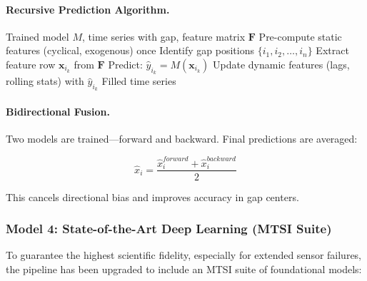 \documentclass[12pt,a4paper]{article}
\begin{document}
\paragraph{Recursive Prediction Algorithm.}

\begin{algorithm}[H]
\caption{XGBoost Recursive Gap Filling (Optimized $O(n)$)}
\begin{algorithmic}[1]
\Require Trained model $M$, time series with gap, feature matrix $\mathbf{F}$
\State Pre-compute static features (cyclical, exogenous) once
\State Identify gap positions $\{i_1, i_2, \ldots, i_n\}$
    \State Extract feature row $\mathbf{x}_{i_k}$ from $\mathbf{F}$
    \State Predict: $\hat{y}_{i_k} = M(\mathbf{x}_{i_k})$
    \State Update dynamic features (lags, rolling stats) with $\hat{y}_{i_k}$
\EndFor
\State \Return Filled time series
\end{algorithmic}
\end{algorithm}

\paragraph{Bidirectional Fusion.} Two models are trained—forward and backward. Final predictions are averaged:

\begin{equation}
    \hat{x}_i = \frac{\hat{x}_i^{forward} + \hat{x}_i^{backward}}{2}
\end{equation}

This cancels directional bias and improves accuracy in gap centers.

\subsubsection{Model 4: State-of-the-Art Deep Learning (MTSI Suite)}

To guarantee the highest scientific fidelity, especially for extended sensor failures, the pipeline has been upgraded to include an MTSI suite of foundational models:
\end{document}
